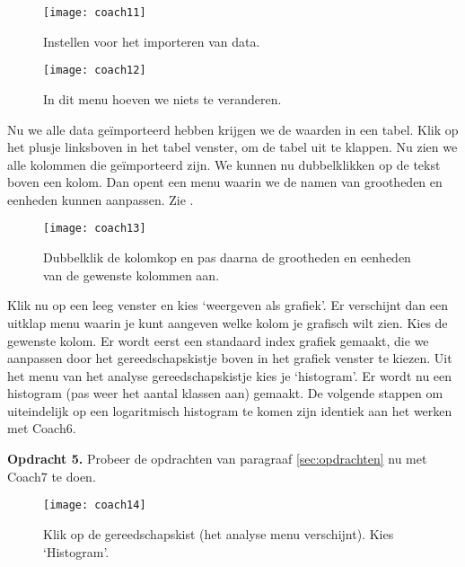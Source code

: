 \begin{figure}
    \centering
    \texttt{[image: coach11]}
    \caption{Instellen voor het importeren van data.}
    \label{fig:coach11}
\end{figure}

\begin{figure}
    \centering
    \texttt{[image: coach12]}
    \caption{In dit menu hoeven we niets te veranderen.}
    \label{fig:coach12}
\end{figure}

Nu we alle data geïmporteerd hebben krijgen we de waarden in een tabel. Klik op het plusje
linksboven in het tabel venster, om de tabel uit te klappen.
Nu zien we alle kolommen die geïmporteerd zijn. We kunnen nu dubbelklikken op
de tekst boven een kolom. Dan opent een menu waarin we de namen van grootheden en eenheden
kunnen aanpassen. Zie .

\begin{figure}
    \centering
    \texttt{[image: coach13]}
    \caption{Dubbelklik de kolomkop en pas daarna de grootheden en eenheden
    van de gewenste kolommen aan.}
    \label{fig:coach13}
\end{figure}

Klik nu op een leeg venster en kies `weergeven als grafiek'. Er verschijnt dan een
uitklap menu waarin je kunt aangeven welke kolom je grafisch wilt zien.
Kies de gewenste kolom. Er wordt eerst een standaard index grafiek gemaakt, die
we aanpassen door het gereedschapskistje boven in het grafiek venster te kiezen.
Uit het menu van het analyse gereedschapskistje kies je `histogram'. Er wordt
nu een histogram (pas weer het aantal klassen aan) gemaakt. De volgende stappen
om uiteindelijk op een logaritmisch histogram te komen zijn identiek aan het
werken met Coach6.
\hspace{3 mm}

\textbf{Opdracht 5.}
Probeer de opdrachten van paragraaf \ref{sec:opdrachten} nu met Coach7 te doen.

\begin{figure}
    \centering
    \texttt{[image: coach14]}
    \caption{Klik op de gereedschapskist (het analyse menu verschijnt). Kies `Histogram'.}
    \label{fig:coach14}
\end{figure}


